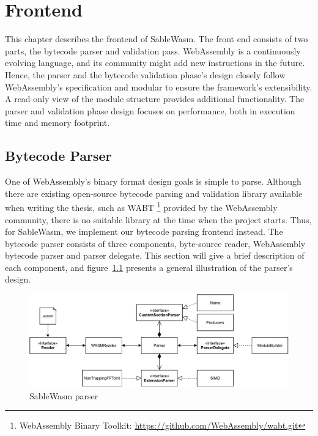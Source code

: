\chapter{Frontend}

This chapter describes the frontend of SableWasm. The front end consists of two parts, the bytecode parser and validation pass.  WebAssembly is a continuously evolving language, and its community might add new instructions in the future. Hence, the parser and the bytecode validation phase's design closely follow WebAssembly's specification and modular to ensure the framework's extensibility. A read-only view of the module structure provides additional functionality. The parser and validation phase design focuses on performance, both in execution time and memory footprint.

\section{Bytecode Parser}
One of WebAssembly's binary format design goals is simple to parse. Although there are existing open-source bytecode parsing and validation library available when writing the thesis, such as WABT \footnote{WebAssembly Binary Toolkit: \url{https://github.com/WebAssembly/wabt.git}} provided by the WebAssembly community, there is no suitable library at the time when the project starts. Thus, for SableWasm, we implement our bytecode parsing frontend instead. The bytecode parser consists of three components, byte-source reader, WebAssembly bytecode parser and parser delegate. This section will give a brief description of each component, and figure~\ref{fig:sablewasm-parser} presents a general illustration of the parser's design.

\begin{figure}
  \centering
  \includegraphics[width=\textwidth]{Images/sablewasm-parser.pdf}
  \caption{SableWasm parser}
  \label{fig:sablewasm-parser}
\end{figure}

